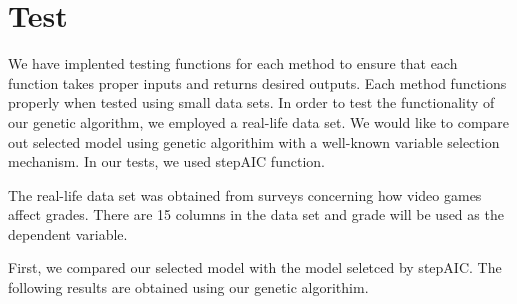 \documentclass{article}\usepackage[]{graphicx}\usepackage[]{color}
\begin{document}
\section{Test}
We have implented testing functions for each method to ensure that each 
function takes proper inputs and returns desired outputs. Each method 
functions properly when tested using small data sets. In order to test the 
functionality of our genetic algorithm, we employed a real-life data set. We 
would like to compare out selected model using genetic algorithim with a 
well-known variable selection mechanism. In our tests, we used stepAIC function. 


The real-life data set was obtained from surveys concerning how video games 
affect grades. There are 15 columns in the data set and grade will be used as  
the dependent variable.


First, we compared our selected model with the model seletced by stepAIC.
The following results are obtained using our genetic algorithim.
\end{document}
